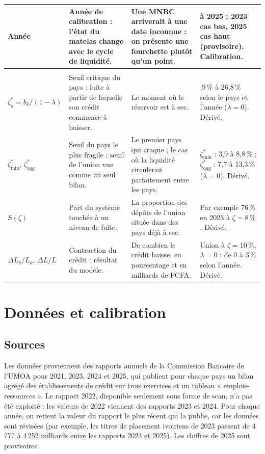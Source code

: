 \documentclass[11pt,a4paper]{article}
\newcommand{\zs}{\zeta^{*}}
\begin{document}
{\begin{longtable}{>{\raggedright\arraybackslash}p{2.0cm}>{\raggedright\arraybackslash}p{4.1cm}>{\raggedright\arraybackslash}p{5.4cm}>{\raggedright\arraybackslash}p{3.8cm}}
			\addlinespace
			Année & Année de calibration : l'état du matelas change avec le cycle de liquidité. & Une MNBC arriverait à une date inconnue : on présente une fourchette plutôt qu'un point. & 2021 à 2025 ; 2023 cas bas, 2025 cas haut (provisoire). Calibration. \\
			\midrule
			\multicolumn{4}{l}{\textbf{D. Grandeurs dérivées (résultats)}}\\
			\midrule
			$\zs_k=b_k/(1-\lambda)$ & Seuil critique du pays : fuite à partir de laquelle son crédit commence à baisser. & Le moment où le réservoir est à sec. & 3,9\,\% à 26,8\,\% selon le pays et l'année ($\lambda=0$). Dérivé. \\
			\addlinespace
			$\zs_{\min}$, $\zs_{agg}$ & Seuil du pays le plus fragile ; seuil de l'union vue comme un seul bilan. & Le premier pays qui craque ; le cas où la liquidité circulerait parfaitement entre les pays. & $\zs_{\min}$ : 3,9 à 8,8\,\% ; $\zs_{agg}$ : 7,7 à 13,3\,\% ($\lambda=0$). Dérivé. \\
			\addlinespace
			$S(\zeta)$ & Part du système touchée à un niveau de fuite. & La proportion des dépôts de l'union située dans des pays déjà à sec. & Par exemple 76\,\% en 2023 à $\zeta=8\,\%$. Dérivé. \\
			\addlinespace
			$\Delta L_k/L_k$, $\Delta L/L$ & Contraction du crédit : résultat du modèle. & De combien le crédit baisse, en pourcentage et en milliards de FCFA. & Union à $\zeta=10\,\%$, $\lambda=0$ : de 0 à 3\,\% selon l'année. Dérivé. \\
		\end{longtable}
	}
	
	
	\section{Données et calibration}\label{sec:donnees}
	
	\subsection{Sources}
	
	Les données proviennent des rapports annuels de la Commission Bancaire de l'UMOA pour 2021, 2023, 2024 et 2025, qui publient pour chaque pays un bilan agrégé des établissements de crédit sur trois exercices et un tableau « emplois-ressources ». Le rapport 2022, disponible seulement sous forme de scan, n'a pas été exploité : les valeurs de 2022 viennent des rapports 2023 et 2024. Pour chaque année, on retient la valeur du rapport le plus récent qui la publie, car les données sont révisées (par exemple, les titres de placement ivoiriens de 2023 passent de 4\,777 à 4\,252 milliards entre les rapports 2023 et 2025). Les chiffres de 2025 sont provisoires.
	
\end{document}
